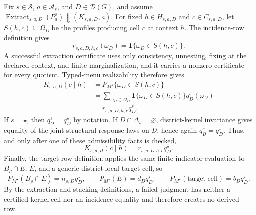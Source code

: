 Fix \(s\in\mathcal S\), \(a\in\mathcal A_s\), and \(D\in\mathcal D(G)\), and assume
\(
\operatorname{Extract}_{s,a,D}(P_a^s)\Downarrow(K_{s,a,D},\kappa)
\).
For fixed \(h\in H_{s,a,D}\) and \(c\in C_{s,a,D}\), let \(S(h,c)\subseteq\Omega_D\) be the profiles producing cell \(c\) at context \(h\).  The incidence-row definition gives
\[
r_{s,a,D,h,c}(\omega_D)=\mathbf 1\{\omega_D\in S(h,c)\}.
\]
A successful extraction certificate uses only consistency, unnesting, fixing at the declared context, and finite marginalization, and it carries a nonzero certificate for every quotient.  Typed-menu realizability therefore gives
\[
\begin{aligned}
K_{s,a,D}(c\mid h)
&=P_{M^s}\{\omega_D\in S(h,c)\}\\
&=\sum_{\omega_D\in\Omega_D}
\mathbf 1\{\omega_D\in S(h,c)\}q_D^s(\omega_D)\\
&=r_{s,a,D,h,c}q_D^s.
\end{aligned}
\]
If \(s=\star\), then \(q_D^s=q_D^\star\) by notation.  If \(D\cap\Delta_s=\varnothing\), district-kernel invariance gives equality of the joint structural-response laws on \(D\), hence again \(q_D^s=q_D^\star\).  Thus, and only after one of these admissibility facts is checked,
\[
K_{s,a,D}(c\mid h)=r_{s,a,D,h,c}q_D^\star.
\]
Finally, the target-row definition applies the same finite indicator evaluation to \(B_\rho\cap E\), \(E\), and a generic district-local target cell, so
\[
P_{M^\star}(B_\rho\cap E)=n_{\rho,D}q_D^\star,
\qquad
P_{M^\star}(E)=d_Dq_D^\star,
\qquad
P_{M^\star}(\text{target cell})=b_Dq_D^\star.
\]
By the extraction and stacking definitions, a failed judgment has neither a certified kernel cell nor an incidence equality and therefore creates no derived row.